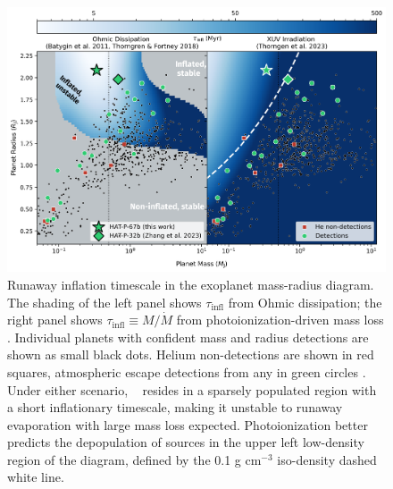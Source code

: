 \documentclass[linenumbers, twocolumn, trackchanges]{aastex631}
\newcommand{\hatpb}{\object{HAT-P-67 b}}
\begin{document}

\begin{figure}[t]
  \includegraphics[width=\linewidth]{thorn2023_theory.png}
  \caption{Runaway inflation timescale in the exoplanet mass-radius diagram.  The shading of the left panel shows $\tau_\mathrm{infl}$ from Ohmic dissipation; the right panel shows $\tau_\mathrm{infl}\equiv M/\dot{M}$ from photoionization-driven mass loss .  Individual planets with confident mass and radius detections are shown as small black dots. Helium non-detections are shown in red squares, atmospheric escape detections from any  in green circles \citep{2022arXiv221116243D}.   Under either scenario, \hatpb~ resides in a sparsely populated region with a short inflationary timescale, making it unstable to runaway evaporation with large mass loss expected.  Photoionization better predicts the depopulation of sources in the upper left low-density region of the diagram, defined by the 0.1 g cm$^{-3}$ iso-density dashed white line.}
  \label{fig:tf2018_theory}
\end{figure}
\end{document}
